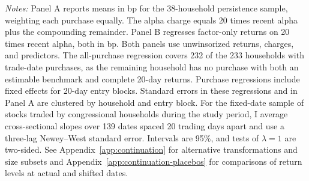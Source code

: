 \begin{table}[H]
\begin{threeparttable}
\begin{tablenotes}[flushleft]
\item \textit{Notes:} Panel A reports means in bp for the 38-household persistence sample, weighting each purchase equally. The alpha charge equals 20 times recent alpha plus the compounding remainder. Panel B regresses factor-only returns on 20 times recent alpha, both in bp. Both panels use unwinsorized returns, charges, and predictors. The all-purchase regression covers 232 of the 233 households with trade-date purchases, as the remaining household has no purchase with both an estimable benchmark and complete 20-day returns. Purchase regressions include fixed effects for 20-day entry blocks. Standard errors in these regressions and in Panel A are clustered by household and entry block. For the fixed-date sample of stocks traded by congressional households during the study period, I average cross-sectional slopes over 139 dates spaced 20 trading days apart and use a three-lag Newey--West standard error. Intervals are 95\%, and tests of $\lambda=1$ are two-sided. See Appendix~\ref{app:continuation} for alternative transformations and size subsets and Appendix~\ref{app:continuation-placebos} for comparisons of return levels at actual and shifted dates.
\end{tablenotes}\end{threeparttable}
\end{table}

